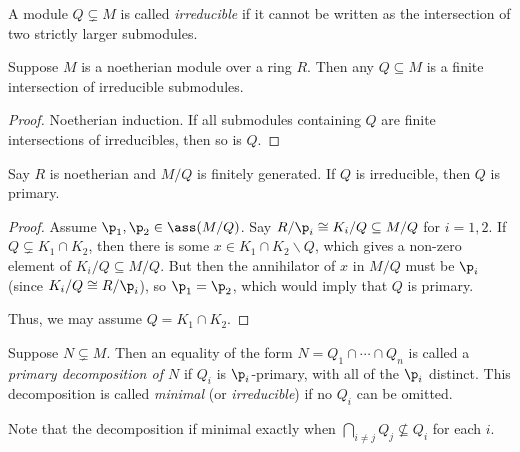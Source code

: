  \begin{definition}
   A module $Q\subsetneq M$ is called \emph{irreducible} if it cannot be written as the
   intersection of two strictly larger submodules.
 \end{definition}
 \begin{lemma}
   Suppose $M$ is a noetherian module over a ring $R$. Then any $Q\subseteq M$ is a
   finite intersection of irreducible submodules.
 \end{lemma}
 \begin{proof}
   Noetherian induction. If all submodules containing $Q$ are finite intersections of
   irreducibles, then so is $Q$.
 \end{proof}
 \begin{theorem}
   Say $R$ is noetherian and $M/Q$ is finitely generated. If $Q$ is irreducible, then $Q$
   is primary.
 \end{theorem}
 \begin{proof}
   Assume $\p_1,\p_2\in \ass (M/Q)$. Say $R/\p_i \cong K_i/Q \subseteq M/Q$ for $i=1,2$.
   If $Q\subsetneq K_1\cap K_2$, then there is some $x\in K_1\cap K_2\smallsetminus Q$,
   which gives a non-zero element of $K_i/Q\subseteq M/Q$. But then the annihilator of
   $x$ in $M/Q$ must be $\p_i$ (since $K_i/Q\cong R/\p_i$), so $\p_1=\p_2$, which would
   imply that $Q$ is primary.

   Thus, we may assume $Q=K_1\cap K_2$. 
 \end{proof}
 \begin{definition}
   Suppose $N\subsetneq M$. Then an equality of the form $N=Q_1\cap \cdots \cap Q_n$ is
   called a \emph{primary decomposition of $N$} if $Q_i$ is $\p_i$-primary, with all of
   the $\p_i$ distinct. This decomposition is called \emph{minimal} (or
   \emph{irreducible}) if no $Q_i$ can be omitted.
 \end{definition}
 Note that the decomposition if minimal exactly when $\bigcap_{i\neq j} Q_j\not\subseteq
 Q_i$ for each $i$.
 \setcounter{lecture}{13}

